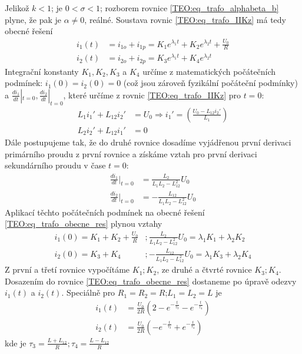 \begin{example}
       Jelikož $k<1$; je $0<\sigma<1$; rozborem rovnice \ref{TEO:eq_trafo_alphabeta_b} plyne, že pak
       je $\alpha\neq0$, reálné. Soustava rovnic \ref{TEO:eq_trafo_IIKz} má tedy obecné řešení
       \begin{align}\label{TEO:eq_trafo_obecne_res}
         i_1(t) &= i_{1o} +i_{1p} = K_1e^{\lambda_1t} + K_2e^{\lambda_2t} +\frac{U_0}{R} \\
         i_2(t) &= i_{2o} +i_{2p} = K_3e^{\lambda_1t} + K_4e^{\lambda_2t}
       \end{align}
       Integrační konstanty $K_1, K_2, K_3$ a $K_4$ určíme z matematických počátečních podmínek:
       $i_1(0)=i_2(0)=0$ (což jsou zároveň fyzikální počáteční podmínky) a
       $\frac{di_1}{dt}|_{t=0},\frac{di_2}{dt}|_{t=0}$, které určíme z rovnic
       \ref{TEO:eq_trafo_IIKz} pro $t=0$:
       \begin{align}\label{TEO:eq_trafo_didt_t0}
         L_1i_1'+L_{12}i_2' &= U_0 \Longrightarrow i_1' = \left(\frac{U_0-L_{12}i_2'}{L_1}\right)\\
         L_2i_2'+L_{12}i_1' &= 0
       \end{align}
       Dále postupujeme tak, že do druhé rovnice dosadíme vyjádřenou první derivaci primárního
       proudu z první rovnice a získáme vztah pro první derivaci sekundárního proudu v čase $t=0$:
       \begin{align}\label{TEO:eq_trafo_dev_i1i2}
         \frac{di_1}{dt}|_{t=0} &=   \frac{L_{2}}{L_1L_2-L_{12}^2}U_0  \\
         \frac{di_2}{dt}|_{t=0} &=  -\frac{L_{12}}{L_1L_2-L_{12}^2}U_0
       \end{align}
       Aplikací těchto počátečních podmínek na obecné řešení \ref{TEO:eq_trafo_obecne_res} plynou
       vztahy
       \begin{align}
         i_1(0) = K_1 + K_2 +\frac{U_0}{R} &;  \frac{L_{2}}{L_1L_2-L_{12}^2}U_0 = 
                                               \lambda_1K_1 + \lambda_2K_2 \\
         i_2(0) = K_3 + K_4                &; -\frac{L_{12}}{L_1L_2-L_{12}^2}U_0 = 
                                               \lambda_1K_3 + \lambda_2K_4
       \end{align}
       Z první a třetí rovnice vypočítáme $K_1; K_2$, ze druhé a čtvrté rovnice $K_3; K_4$.
       Do\-sa\-ze\-ním do rovnice \ref{TEO:eq_trafo_obecne_res} dostaneme po úpravě odezvy $i_1(t)$
       a $i_2(t)$. Speciálně pro $R_1=R_2=R$;$L_1=L_2=L$ je
       \begin{align}\label{TEO:eq_trafo_solved_RL}
         i_1(t) &= \frac{U_0}{2R}\left(2-e^{-\frac{t}{\tau_3}}-e^{-\frac{t}{\tau_4}}\right) \\
         i_2(t) &= \frac{U_0}{2R}\left(-e^{-\frac{t}{\tau_3}}+e^{-\frac{t}{\tau_4}}\right)
       \end{align}
       kde je $\tau_3 = \frac{L + L_{12}}{R}; \tau_4 = \frac{L - L_{12}}{R}$


\end{example}
